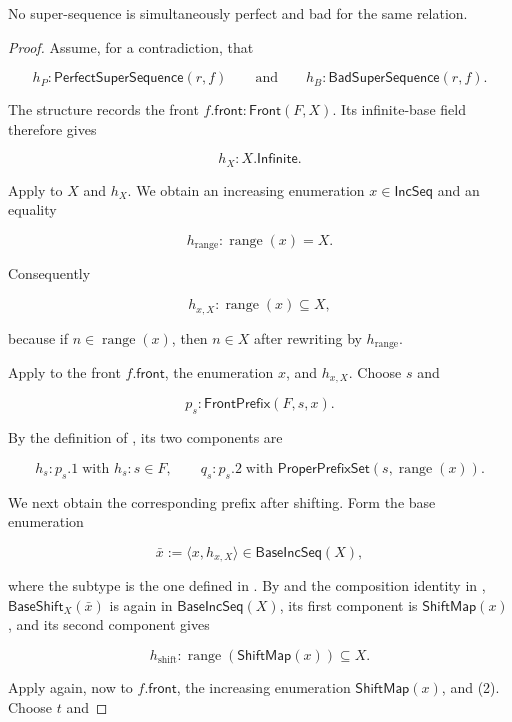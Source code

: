 \begin{lemma}
No super-sequence is simultaneously perfect and bad for the same relation.
\end{lemma}
\begin{proof}
Assume, for a contradiction, that

\[
h_P:\mathsf{PerfectSuperSequence}(r,f)
\qquad\text{and}\qquad
h_B:\mathsf{BadSuperSequence}(r,f).
\]

The structure  records the front
$f.\mathsf{front}:\mathsf{Front}(F,X)$.  Its infinite-base field therefore
gives

\[
h_X:X.\mathsf{Infinite}.
\]

Apply  to $X$ and $h_X$.  We obtain an
increasing enumeration $x\in\mathsf{IncSeq}$ and an equality

\[
h_{\mathrm{range}}:\operatorname{range}(x)=X.
\]

Consequently

\[
h_{x,X}:\operatorname{range}(x)\subseteq X,
\]

because if $n\in\operatorname{range}(x)$, then
$n\in X$ after rewriting by $h_{\mathrm{range}}$.

Apply  to the front $f.\mathsf{front}$, the
enumeration $x$, and $h_{x,X}$.  Choose $s$ and

\[
p_s:\mathsf{FrontPrefix}(F,s,x).
\]

By the definition of , its two components are

\[
h_s:p_s.1\;\text{with }h_s:s\in F,
\qquad
q_s:p_s.2\;\text{with }
\mathsf{ProperPrefixSet}(s,\operatorname{range}(x)).
\tag{1}
\]

We next obtain the corresponding prefix after shifting.  Form the base
enumeration

\[
\bar x:=\langle x,h_{x,X}\rangle\in\mathsf{BaseIncSeq}(X),
\]

where the subtype is the one defined in .  By
 and the composition identity in ,
$\mathsf{BaseShift}_X(\bar x)$ is again in
$\mathsf{BaseIncSeq}(X)$, its first component is
$\mathsf{ShiftMap}(x)$, and its second component gives

\[
h_{\operatorname{shift}}:\operatorname{range}(\mathsf{ShiftMap}(x))\subseteq X.
\tag{2}
\]

Apply  again, now to $f.\mathsf{front}$, the
increasing enumeration $\mathsf{ShiftMap}(x)$, and (2).  Choose $t$ and


\end{proof}
